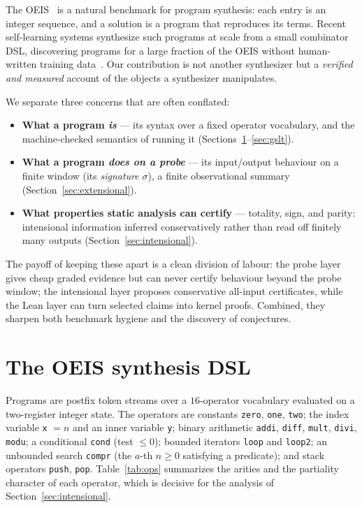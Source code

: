 \documentclass[11pt]{article}
\newcommand{\code}[1]{\texttt{#1}}
\newcommand{\sig}{\ensuremath{\sigma}}
\begin{document}
The OEIS~\cite{oeis} is a natural benchmark for program synthesis: each entry is an integer sequence,
and a solution is a program that reproduces its terms. Recent self-learning systems
synthesize such programs at scale from a small combinator DSL, discovering programs for a
large fraction of the OEIS without human-written training
data~\cite{gauthier2023,gauthier2025}. Our contribution is not another synthesizer but a
\emph{verified and measured} account of the objects a synthesizer manipulates.

We separate three concerns that are often conflated:
\begin{itemize}
  \item \textbf{What a program \emph{is}} --- its syntax over a fixed operator vocabulary,
        and the machine-checked semantics of running it (Sections~\ref{sec:dsl}--\ref{sec:gslt}).
  \item \textbf{What a program \emph{does on a probe}} --- its input/output behaviour on a
        finite window (its \emph{signature} \sig), a finite observational summary
        (Section~\ref{sec:extensional}).
  \item \textbf{What properties static analysis can certify} --- totality, sign, and
        parity: intensional information inferred conservatively rather than read off
        finitely many outputs (Section~\ref{sec:intensional}).
\end{itemize}
The payoff of keeping these apart is a clean division of labour: the probe layer
gives cheap graded evidence but can never certify behaviour beyond the probe window; the
intensional layer proposes conservative all-input certificates, while the Lean layer can
turn selected claims into kernel proofs. Combined, they sharpen both benchmark hygiene and
the discovery of conjectures.

\section{The OEIS synthesis DSL}
\label{sec:dsl}

Programs are postfix token streams over a $16$-operator vocabulary evaluated on a
two-register integer state. The operators are constants \code{zero}, \code{one},
\code{two}; the index variable \code{x} $=n$ and an inner variable \code{y}; binary
arithmetic \code{addi}, \code{diff}, \code{mult}, \code{divi}, \code{modu}; a conditional
\code{cond} (test $\le 0$); bounded iterators \code{loop} and \code{loop2}; an unbounded
search \code{compr} (the $a$-th $n\ge 0$ satisfying a predicate); and stack operators
\code{push}, \code{pop}. Table~\ref{tab:ops} summarizes the arities and the partiality
character of each operator, which is decisive for the analysis of
Section~\ref{sec:intensional}.
\end{document}
